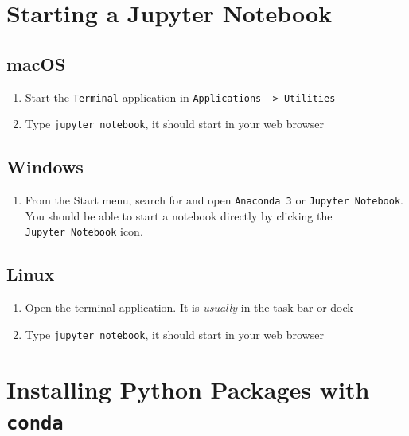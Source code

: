 \documentclass[]{book}
\providecommand{\tightlist}{%
  \setlength{\itemsep}{0pt}\setlength{\parskip}{0pt}}
\theoremstyle{definition}
\theoremstyle{definition}
\theoremstyle{definition}
\theoremstyle{remark}
\begin{document}
\hypertarget{starting-a-jupyter-notebook}{%
\section{Starting a Jupyter
Notebook}\label{starting-a-jupyter-notebook}}

\hypertarget{macos}{%
\subsection{macOS}\label{macos}}

\begin{enumerate}
\def\labelenumi{\arabic{enumi}.}
\tightlist
\item
  Start the \texttt{Terminal} application in
  \texttt{Applications\ -\textgreater{}\ Utilities}
\item
  Type \texttt{jupyter\ notebook}, it should start in your web browser
\end{enumerate}

\hypertarget{windows}{%
\subsection{Windows}\label{windows}}

\begin{enumerate}
\def\labelenumi{\arabic{enumi}.}
\tightlist
\item
  From the Start menu, search for and open \texttt{Anaconda\ 3} or
  \texttt{Jupyter\ Notebook}. You should be able to start a notebook
  directly by clicking the \texttt{Jupyter\ Notebook} icon.
\end{enumerate}

\hypertarget{linux}{%
\subsection{Linux}\label{linux}}

\begin{enumerate}
\def\labelenumi{\arabic{enumi}.}
\tightlist
\item
  Open the terminal application. It is \emph{usually} in the task bar or
  dock
\item
  Type \texttt{jupyter\ notebook}, it should start in your web browser
\end{enumerate}

\hypertarget{installing-python-packages-with-conda}{%
\section{\texorpdfstring{Installing Python Packages with
\texttt{conda}}{Installing Python Packages with conda}}\label{installing-python-packages-with-conda}}
\end{document}
